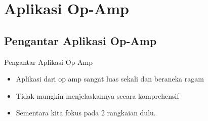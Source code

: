 \section{Aplikasi Op-Amp}

\subsection{Pengantar Aplikasi Op-Amp}
\begin{frame}{Pengantar Aplikasi Op-Amp}
	\begin{itemize}
		\item Aplikasi dari op amp sangat luas sekali dan beraneka ragam
		\item Tidak mungkin menjelaskannya secara komprehensif
		\item Sementara kita fokus pada 2 rangkaian dulu.
	\end{itemize}
\end{frame}

